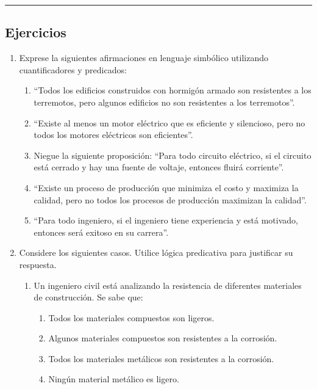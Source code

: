 \rule{\textwidth}{.5pt}

\subsection{Ejercicios}

\begin{enumerate}[label=\textbf{\arabic*}.]
	
	\item Exprese la siguientes afirmaciones en lenguaje simbólico utilizando cuantificadores y predicados:
	\begin{enumerate}
		\item ``Todos los edificios construidos con hormigón armado son resistentes a los terremotos, pero algunos edificios no son resistentes a los terremotos''.
		
		\item ``Existe al menos un motor eléctrico que es eficiente y silencioso, pero no todos los motores eléctricos son eficientes''.
		
		\item Niegue la siguiente proposición: ``Para todo circuito eléctrico, si el circuito está cerrado y hay una fuente de voltaje, entonces fluirá corriente''.
		
		\item ``Existe un proceso de producción que minimiza el costo y maximiza la calidad, pero no todos los procesos de producción maximizan la calidad''.
		
		\item ``Para todo ingeniero, si el ingeniero tiene experiencia y está motivado, entonces será exitoso en su carrera''.
	\end{enumerate}
	
	\item Considere los siguientes casos. Utilice lógica predicativa para justificar su respuesta.
	
	\begin{enumerate}
		\item Un ingeniero civil está analizando la resistencia de diferentes materiales de construcción. Se sabe que:
		\begin{enumerate}[itemsep=-3pt, label=\roman*)]
			\item Todos los materiales compuestos son ligeros.
			\item Algunos materiales compuestos son resistentes a la corrosión.
			\item Todos los materiales metálicos son resistentes a la corrosión.
			\item Ningún material metálico es ligero.
		\end{enumerate}
		

\end{enumerate}
\end{enumerate}
